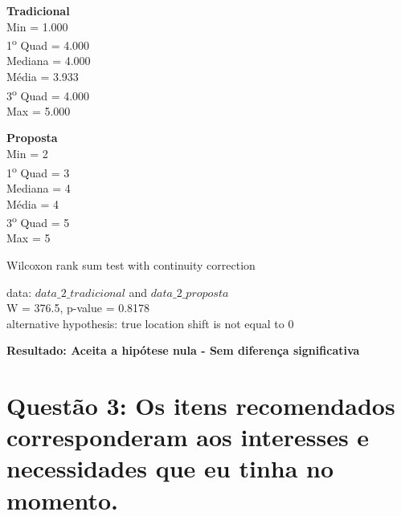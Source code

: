 \begin{multicols}{2}

\noindent\textbf{Tradicional}\\
Min = 1.000\\
1\textsuperscript{o} Quad = 4.000\\
Mediana = 4.000\\
Média = 3.933\\
3\textsuperscript{o} Quad = 4.000\\
Max = 5.000\\
\columnbreak

\noindent\textbf{Proposta}\\
Min = 2\\
1\textsuperscript{o} Quad = 3\\
Mediana = 4\\
Média = 4\\
3\textsuperscript{o} Quad = 5\\
Max = 5
\end{multicols}

Wilcoxon rank sum test with continuity correction

\noindent
data:  $data\_2\_tradicional$ and $data\_2\_proposta$\\
W = 376.5, p-value = 0.8178\\
alternative hypothesis: true location shift is not equal to 0

\noindent
\textbf{Resultado: Aceita a hipótese nula - Sem diferença significativa}

\newpage
\section{Questão 3: Os itens recomendados corresponderam aos  interesses e necessidades que eu tinha no momento.}

